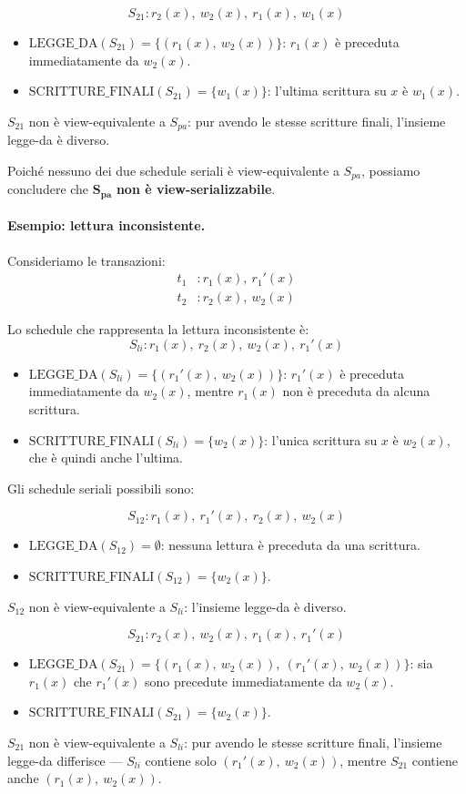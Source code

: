\[
S_{21} : r_2(x),\ w_2(x),\ r_1(x),\ w_1(x)
\]
\begin{itemize}
	\item $\text{LEGGE\_DA}(S_{21}) = \{(r_1(x),\ w_2(x))\}$: $r_1(x)$ è preceduta immediatamente da $w_2(x)$.
	\item $\text{SCRITTURE\_FINALI}(S_{21}) = \{w_1(x)\}$: l'ultima scrittura su $x$ è $w_1(x)$.
\end{itemize}
$S_{21}$ non è view-equivalente a $S_{pa}$: pur avendo le stesse scritture finali, l'insieme legge-da è diverso.

Poiché nessuno dei due schedule seriali è view-equivalente a $S_{pa}$, possiamo concludere che $\mathbf{S_{pa}}$ \textbf{non è view-serializzabile}.
\paragraph{Esempio: lettura inconsistente.}

Consideriamo le transazioni:
\begin{align*}
	t_1 &: r_1(x),\ r_1'(x) \\
	t_2 &: r_2(x),\ w_2(x)
\end{align*}

Lo schedule che rappresenta la lettura inconsistente è:
\[
S_{li} : r_1(x),\ r_2(x),\ w_2(x),\ r_1'(x)
\]

\begin{itemize}
	\item $\text{LEGGE\_DA}(S_{li}) = \{(r_1'(x),\ w_2(x))\}$: $r_1'(x)$ è preceduta immediatamente da $w_2(x)$, mentre $r_1(x)$ non è preceduta da alcuna scrittura.
	\item $\text{SCRITTURE\_FINALI}(S_{li}) = \{w_2(x)\}$: l'unica scrittura su $x$ è $w_2(x)$, che è quindi anche l'ultima.
\end{itemize}

Gli schedule seriali possibili sono:

\[
S_{12} : r_1(x),\ r_1'(x),\ r_2(x),\ w_2(x)
\]
\begin{itemize}
	\item $\text{LEGGE\_DA}(S_{12}) = \emptyset$: nessuna lettura è preceduta da una scrittura.
	\item $\text{SCRITTURE\_FINALI}(S_{12}) = \{w_2(x)\}$.
\end{itemize}
$S_{12}$ non è view-equivalente a $S_{li}$: l'insieme legge-da è diverso.

\[
S_{21} : r_2(x),\ w_2(x),\ r_1(x),\ r_1'(x)
\]
\begin{itemize}
	\item $\text{LEGGE\_DA}(S_{21}) = \{(r_1(x),\ w_2(x)),\ (r_1'(x),\ w_2(x))\}$: sia $r_1(x)$ che $r_1'(x)$ sono precedute immediatamente da $w_2(x)$.
	\item $\text{SCRITTURE\_FINALI}(S_{21}) = \{w_2(x)\}$.
\end{itemize}
$S_{21}$ non è view-equivalente a $S_{li}$: pur avendo le stesse scritture finali, l'insieme legge-da differisce — $S_{li}$ contiene solo $(r_1'(x),\ w_2(x))$, mentre $S_{21}$ contiene anche $(r_1(x),\ w_2(x))$.

